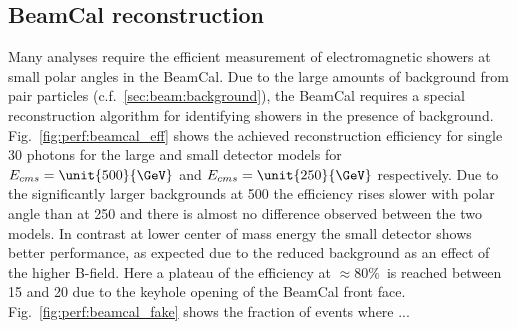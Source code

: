 \subsection{BeamCal reconstruction}

Many analyses require the efficient measurement of electromagnetic showers at small polar angles in the BeamCal.
Due to the large amounts of background from pair particles (c.f.~\ref{sec:beam:background}), the BeamCal requires a special reconstruction algorithm
for identifying showers in the presence of background.
Fig.~\ref{fig:perf:beamcal_eff} shows the achieved reconstruction efficiency for single \unit{30}{\GeV} photons for the large and small detector models
for $E_{cms}=\unit{500}{\GeV}$  and $E_{cms}=\unit{250}{\GeV}$ respectively. Due to the significantly larger backgrounds at \unit{500}{\GeV} the efficiency
rises slower with polar angle than at \unit{250}{\GeV} and there is almost no difference observed between the two models.
In contrast at lower center of mass energy the small detector shows better performance, as expected due to the reduced background as an effect of the
higher B-field. Here a plateau of the efficiency at $\approx 80\%$~is reached between \unit{15}{\mrad} and \unit{20}{\mrad} due to the keyhole opening
of the BeamCal front face.
Fig.~\ref{fig:perf:beamcal_fake} shows the fraction of events where ... 
%
%
